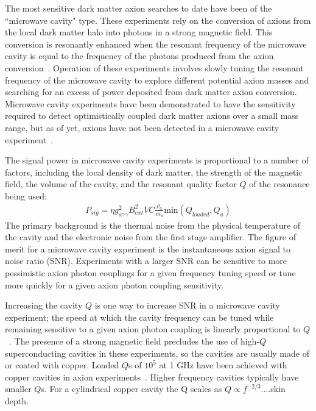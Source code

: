 \documentclass[aps,prl,twocolumn,groupedaddress]{revtex4-1}
\begin{document}
The most sensitive dark matter axion searches to date have been of the ``microwave cavity" type.
These experiments rely on the conversion of axions from the local dark matter halo into photons in a strong magnetic field.
This conversion is resonantly enhanced when the resonant frequency of the microwave cavity is equal to the frequency of the photons produced from the axion conversion~\cite{PhysRevLett.51.1415}.
Operation of these experiments involves slowly tuning the resonant frequency of the microwave cavity to explore different potential axion masses and searching for an excess of power deposited from dark matter axion conversion.
Microwave cavity experiments have been demonstrated to have the sensitivity required to detect optimistically coupled dark matter axions over a small mass range,
but as of yet, axions have not been detected in a microwave cavity experiment~\cite{PhysRevLett.104.041301}.

The signal power in microwave cavity experiments is proportional to a number of factors, including the local density of dark matter, the strength of the magnetic field, the volume of the cavity, and the resonant 
quality factor $Q$ of the resonance being used:
\begin{align}
P_{sig} = \eta g_{a\gamma\gamma}^2B_{ext}^2VC\frac{\rho_a}{m_a}\text{min}(Q_{loaded},Q_a)
\end{align}
The primary background is the thermal noise from the physical temperature of the cavity and the electronic noise from the first stage amplifier.  
The figure of merit for a microwave cavity experiment is the instantaneous axion signal to noise ratio (SNR).
Experiments with a larger SNR can be sensitive to more pessimistic axion photon couplings for a given frequency tuning speed or tune more quickly for a given axion photon coupling sensitivity.

Increasing the cavity $Q$ is one way to increase SNR in a microwave cavity experiment; the speed at which the cavity frequency can be tuned while remaining sensitive to a given axion photon coupling is linearly proportional to $Q$~\cite{Peng2000569}.
The presence of a strong magnetic field precludes the use of high-$Q$ superconducting cavities in these experiments, so the cavities are usually made of or coated with copper.
Loaded $Q$s of $10^5$ at 1 GHz have been achieved with copper cavities in axion experiments~\cite{Peng2000569}.  Higher frequency cavities typically have smaller $Q$s.
For a cylindrical copper cavity the Q scales as $Q \propto f^{-2/3}$....skin depth.
\end{document}
